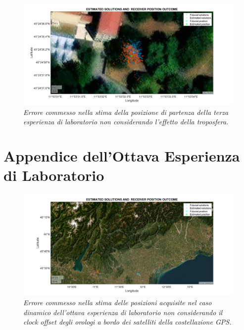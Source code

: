 \documentclass[a4paper,11pt,twoside]{book}
\begin{document}
	\begin{figure}[H]
		\centering
		\includegraphics[scale=0.31]{"Immagini workbook/Immagini esp3/err_tropo"}
		\caption{\textit{Errore commesso nella stima della posizione di partenza della terza esperienza di laboratorio non considerando l'effetto della troposfera.}}
		\label{fig:errtropo3}
	\end{figure}

	\clearpage
	
	\section{Appendice dell'Ottava Esperienza di Laboratorio}
	
	\vspace{-0.85cm}
	
	\begin{figure}[H]
		\centering
		\includegraphics[scale=0.30]{"Immagini workbook/Immagini esp8/err_clock_8"}
		\caption{\textit{Errore commesso nella stima delle posizioni acquisite nel caso dinamico dell'ottava esperienza di laboratorio non considerando il clock offset degli orologi a bordo dei satelliti della costellazione GPS.}}
		\label{fig:errclock8}
	\end{figure}
	
	\vspace{-0.7cm}
	
\end{document}
